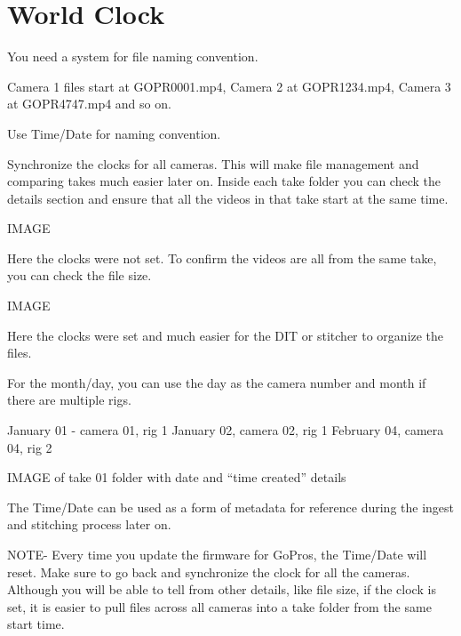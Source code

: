 \chapter{World Clock}
\pagecolor{white}
\label{chap:5}
\begin{fullwidth}


\problem

{\large You need a system for file naming convention.
 \par}

Camera 1 files start at GOPR0001.mp4, Camera 2 at GOPR1234.mp4, Camera 3 at GOPR4747.mp4 and so on. 


\solution

{\large Use Time/Date for naming convention.

 \par}

Synchronize the clocks for all cameras. This will make file management and comparing takes much easier later on. Inside each take folder you can check the details section and ensure that all the videos in that take start at the same time. 

IMAGE

Here the clocks were not set. To confirm the videos are all from the same take, you can check the file size. 

IMAGE

Here the clocks were set and much easier for the DIT or stitcher to organize the files.

For the month/day, you can use the day as the camera number and month if there are multiple rigs. 

January 01 - camera 01, rig 1
January 02, camera 02, rig 1
February 04, camera 04, rig 2

IMAGE of take 01 folder with date and “time created” details


The Time/Date can be used as a form of metadata for reference during the ingest and stitching process later on. 

NOTE- Every time you update the firmware for GoPros, the Time/Date will reset. Make sure to go back and synchronize the clock for all the cameras. Although you will be able to tell from other details, like file size, if the clock is set, it is easier to pull files across all cameras into a take folder from the same start time. 




\clearpage
\end{fullwidth}
